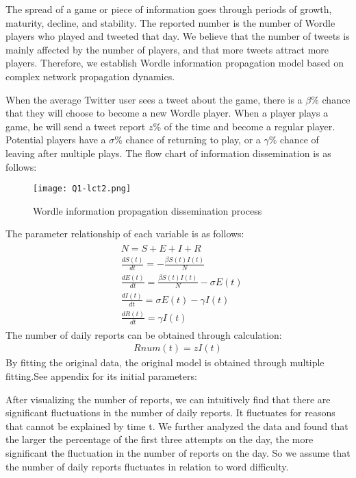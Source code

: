 \documentclass{mcmthesis}
\begin{document}
The spread of a game or piece of information goes through periods of growth, maturity, decline, and stability. The reported number is the number of Wordle players who played and tweeted that day. We believe that the number of tweets is mainly affected by the number of players, and that more tweets attract more players. Therefore, we establish Wordle information propagation model based on complex network propagation dynamics.

When the average Twitter user sees a tweet about the game, there is a $\beta\%$ chance that they will choose to become a new Wordle player. When a player plays a game, he will send a tweet report $z\%$ of the time and become a regular player. Potential players have a $\sigma\%$ chance of returning to play, or a $ \gamma\%$ chance of leaving after multiple plays. The flow chart of information dissemination is as follows:
\begin{figure}[H]
	\centering
	\texttt{[image: Q1-lct2.png]}
	\caption{\small Wordle information propagation dissemination process}
\end{figure}
The parameter relationship of each variable is as follows:
\begin{eqnarray}
	\begin{aligned}
		&	 N  = S+E+I+R \\
		&	\frac{d S(t)}{d t} = -\frac{\beta S(t) I(t)}{N} \\
		&	\frac{d E(t)}{d t} = \frac{\beta S(t) I(t)}{N}-\sigma E(t) \\
		&	\frac{d I(t)}{d t} = \sigma E(t)-\gamma I(t) \\
		&	\frac{d R(t)}{d t} = \gamma I(t)
	\end{aligned}	
\end{eqnarray}
\qquad The number of daily reports can be obtained through calculation:
\begin{eqnarray}
	\label{Rnum}
	Rnum(t)=zI(t)
\end{eqnarray}
\qquad By fitting the original data, the original model is obtained through multiple fitting.See appendix for its initial parameters:

After visualizing the number of reports, we can intuitively find that there are significant fluctuations in the number of daily reports. It fluctuates for reasons that cannot be explained by time t. We further analyzed the data and found that the larger the percentage of the first three attempts on the day, the more significant the fluctuation in the number of reports on the day. So we assume that the number of daily reports fluctuates in relation to word difficulty.
\end{document}
